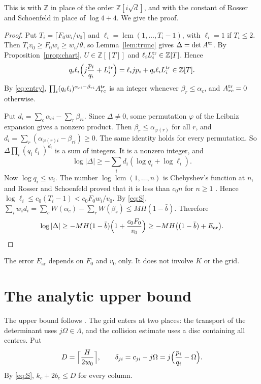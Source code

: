 \documentclass[11pt]{amsart}
\theoremstyle{definition}
\theoremstyle{remark}
\numberwithin{equation}{section}
\newcommand{\Z}{\mathbb Z}
\newcommand{\lcm}{\operatorname{lcm}}
\newcommand{\Ear}{E_{\mathrm{ar}}}
\newcommand{\bb}{\bar b}
\begin{document}
This is \cite[Lemma~15.2 and Corollary~15.3]{ChudnovskyChudnovsky26} with $\Z$ in place of the order
$\Z[i\sqrt d]$, and with the constant of Rosser and Schoenfeld in place of $\log4+4$. We give the proof.

\begin{proof}
Put $T_i=\lceil F_0w_i/v_0\rceil$ and $\ell_i=\lcm(1,\dots,T_i-1)$, with $\ell_i=1$ if $T_i\le2$. Then
$T_iv_0\ge F_0w_i\ge w_i/\theta$, so Lemma~\ref{lem:trunc} gives $\Delta=\det A^{\rm tr}$. By
Proposition~\ref{prop:chart}, $U\in\Z[[T]]$ and $\ell_iL_i^{\rm tr}\in\Z[T]$. Hence
\[
 q_i\ell_i\Bigl(j\frac{p_i}{q_i}+L_i^{\rm tr}\Bigr)=\ell_ijp_i+q_i\ell_iL_i^{\rm tr}\in\Z[T].
\]
By \eqref{eq:entry}, $\prod_i(q_i\ell_i)^{\alpha_{ci}-\beta_{ri}}A^{\rm tr}_{rc}$ is an integer whenever
$\beta_r\le\alpha_c$, and $A^{\rm tr}_{rc}=0$ otherwise.

Put $d_i=\sum_c\alpha_{ci}-\sum_r\beta_{ri}$. Since $\Delta\ne0$, some permutation $\varphi$ of the Leibniz
expansion gives a nonzero product. Then $\beta_r\le\alpha_{\varphi(r)}$ for all $r$, and
$d_i=\sum_r(\alpha_{\varphi(r)i}-\beta_{ri})\ge0$. The same identity holds for every permutation. So
$\Delta\prod_i(q_i\ell_i)^{d_i}$ is a sum of integers. It is a nonzero integer, and
\[
 \log|\Delta|\ge-\sum_id_i(\log q_i+\log\ell_i).
\]
Now $\log q_i\le w_i$. The number $\log\lcm(1,\dots,n)$ is Chebyshev's function at $n$, and Rosser and
Schoenfeld proved that it is less than $c_0n$ for $n\ge1$ \cite[Theorem~12]{RosserSchoenfeld62}. Hence
$\log\ell_i\le c_0(T_i-1)<c_0F_0w_i/v_0$. By \eqref{eq:S},
$\sum_iw_id_i=\sum_cW(\alpha_c)-\sum_rW(\beta_r)\le MH(1-\bb)$. Therefore
\[
 \log|\Delta|\ge-MH(1-\bb)\Bigl(1+\frac{c_0F_0}{v_0}\Bigr)\ge-MH\bigl((1-\bb)+\Ear\bigr).\qedhere
\]
\end{proof}

The error $\Ear$ depends on $F_0$ and $v_0$ only. It does not involve $K$ or the grid.

\section{The analytic upper bound}\label{sec:analytic}

The upper bound follows \cite[Section~16]{ChudnovskyChudnovsky26}. The grid enters at two places: the transport
of the determinant uses $j\Omega\in\Lambda$, and the collision estimate uses a disc containing all centres. Put
\[
 D=\Bigl\lceil\frac H{2w_0}\Bigr\rceil,\qquad \delta_{ji}=c_{ji}-j\Omega=j\Bigl(\frac{p_i}{q_i}-\Omega\Bigr).
\]
By \eqref{eq:S}, $k_c+2b_c\le D$ for every column.
\end{document}
